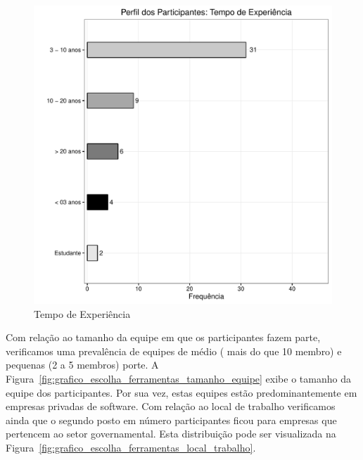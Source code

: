 \begin{figure}[htpb]
	\centering
	\includegraphics[width=0.8\linewidth]{./chapter-estudo-funcionalidades-fgrm/img/grafico_escolha_ferramentas_tempo_experiencia.pdf}
	\caption{Tempo de Experiência}
	\label{fig:grafico_escolha_ferramentas_tempo_experiencia}
\end{figure}

Com relação ao tamanho da equipe em que os participantes fazem parte,
verificamos uma prevalência de equipes de médio ( mais do que 10 membro) e
pequenas (2 a 5 membros) porte. A
Figura~\ref{fig:grafico_escolha_ferramentas_tamanho_equipe} exibe o tamanho da
equipe dos participantes. Por sua vez, estas equipes estão predominantemente em
empresas privadas de software. Com relação ao local de trabalho verificamos
ainda que o segundo posto em número par\-ti\-ci\-pan\-tes ficou para empresas
que pertencem ao setor governamental. Esta distribuição pode ser visualizada na
Figura~\ref{fig:grafico_escolha_ferramentas_local_trabalho}.

